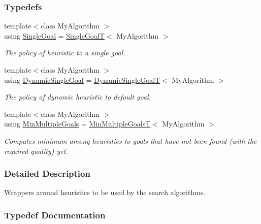 \subsubsection*{Typedefs}
\begin{DoxyCompactItemize}
\item 
{\footnotesize template$<$class My\+Algorithm $>$ }\\using \hyperlink{namespaceslb_1_1ext_1_1policy_1_1heuristic_a6cee0282472a5ca36af95af31fc3513d}{Single\+Goal} = \hyperlink{structslb_1_1ext_1_1policy_1_1heuristic_1_1SingleGoalT}{Single\+GoalT}$<$ My\+Algorithm $>$
\begin{DoxyCompactList}\small\item\em The policy of heuristic to a single goal. \end{DoxyCompactList}\item 
{\footnotesize template$<$class My\+Algorithm $>$ }\\using \hyperlink{namespaceslb_1_1ext_1_1policy_1_1heuristic_abd4d8d1b33c56751ff726b83181b0609}{Dynamic\+Single\+Goal} = \hyperlink{structslb_1_1ext_1_1policy_1_1heuristic_1_1DynamicSingleGoalT}{Dynamic\+Single\+GoalT}$<$ My\+Algorithm $>$
\begin{DoxyCompactList}\small\item\em The policy of dynamic heuristic to default goal. \end{DoxyCompactList}\item 
{\footnotesize template$<$class My\+Algorithm $>$ }\\using \hyperlink{namespaceslb_1_1ext_1_1policy_1_1heuristic_adb60983019024c0557fb57be8feab48c}{Min\+Multiple\+Goals} = \hyperlink{structslb_1_1ext_1_1policy_1_1heuristic_1_1MinMultipleGoalsT}{Min\+Multiple\+GoalsT}$<$ My\+Algorithm $>$
\begin{DoxyCompactList}\small\item\em Computes minimum among heuristics to goals that have not been found (with the required quality) yet. \end{DoxyCompactList}\end{DoxyCompactItemize}


\subsubsection{Detailed Description}
Wrappers around heuristics to be used by the search algorithms. 

\subsubsection{Typedef Documentation}
